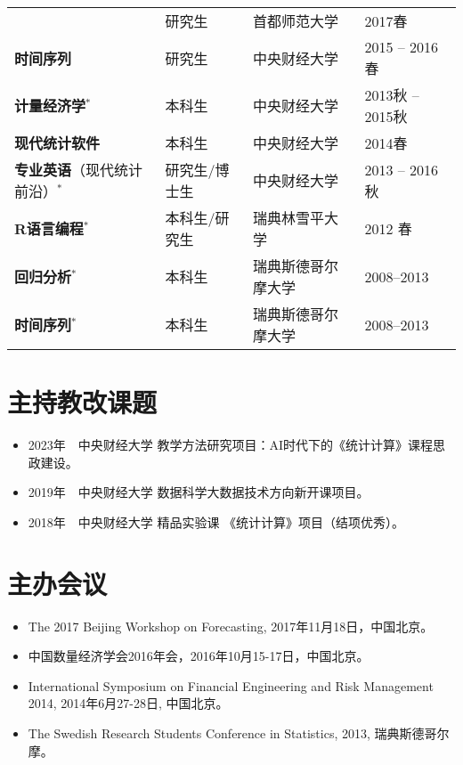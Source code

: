 \documentclass[twoside,a4paper,11pt]{article}
\begin{document}
\begin{tabular}{l l ll}
                                            & 研究生        & 首都师范大学                   & 2017春           \\
  \textbf{时间序列}                         & 研究生        & 中央财经大学                   & 2015 -- 2016春   \\
  \textbf{计量经济学}$^*$                   & 本科生        & 中央财经大学                   & 2013秋 -- 2015秋 \\
  \textbf{现代统计软件}                     & 本科生        & 中央财经大学                   & 2014春           \\
  \textbf{专业英语}（现代统计前沿）$^*$     & 研究生/博士生 & 中央财经大学                   & 2013 -- 2016秋   \\
  \textbf{R语言编程}$^*$                    & 本科生/研究生 & 瑞典林雪平大学                 & 2012 春          \\
  \textbf{回归分析}$^*$                     & 本科生        & 瑞典斯德哥尔摩大学             & 2008--2013       \\
  \textbf{时间序列}$^*$                     & 本科生        & 瑞典斯德哥尔摩大学             & 2008--2013       \\
\bottomrule
\end{tabular}

\section*{主持教改课题}

\begin{itemize}
\item 2023年~~中央财经大学 教学方法研究项目：AI时代下的《统计计算》课程思政建设。
\item 2019年~~中央财经大学 数据科学大数据技术方向新开课项目。
\item 2018年~~中央财经大学 精品实验课 《统计计算》项目（结项优秀）。
\end{itemize}

\section*{主办会议}

\begin{itemize}


\item  The 2017 Beijing Workshop on Forecasting, 2017年11月18日，中国北京。
\item 中国数量经济学会2016年会，2016年10月15-17日，中国北京。

\item International Symposium on Financial Engineering and Risk Management 2014,
  2014年6月27-28日, 中国北京。

\item The Swedish Research Students Conference in Statistics, 2013, 瑞典斯德哥尔摩。
\end{itemize}
\end{document}
